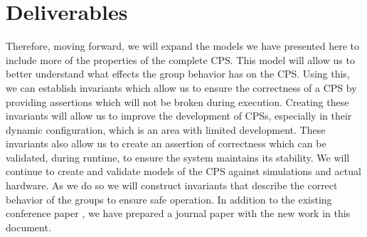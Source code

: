 \section{Deliverables}

Therefore, moving forward, we will expand the models we have presented here to include more of the properties of the complete CPS. This model will allow us to better understand what effects the group behavior has on the CPS. Using this, we can establish invariants which allow us to ensure the correctness of a CPS by providing assertions which will not be broken during execution. Creating these invariants will allow us to improve the development of CPSs, especially in their dynamic configuration, which is an area with limited development. These invariants also allow us to create an assertion of correctness which can be validated, during runtime, to ensure the system maintains its stability. We will continue to create and validate models of the CPS against simulations and actual hardware. As we do so we will construct invariants that describe the correct behavior of the groups to ensure safe operation. In addition to the existing conference paper \cite{CRITIS2012}, we have prepared a journal paper with the new work in this document. 

